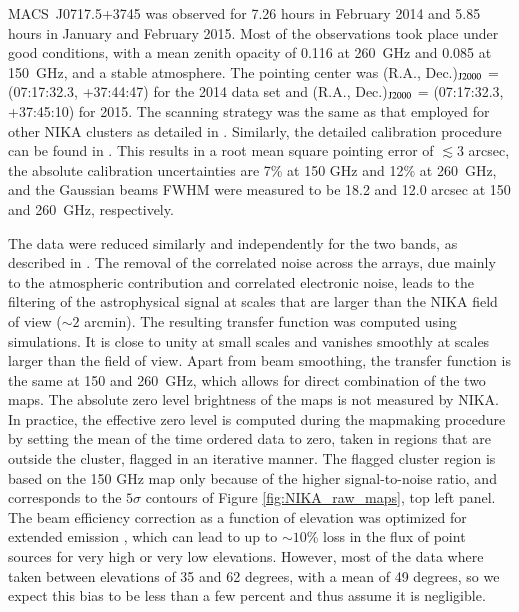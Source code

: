 \documentclass[twocolumn,traditabstract]{aa}
\begin{document}
\mbox{MACS~J0717.5+3745} was observed for 7.26 hours in February 2014 and 5.85 hours in January and February 2015. Most of the observations took place under good conditions, with a mean zenith opacity of 0.116 at 260~GHz and 0.085 at 150~GHz, and a stable atmosphere. The pointing center was (R.A., Dec.)$_{\rm J2000}$ = (07:17:32.3, +37:44:47) for the 2014 data set and (R.A., Dec.)$_{\rm J2000}$ = (07:17:32.3, +37:45:10) for 2015. The scanning strategy was the same as that employed for other NIKA clusters as detailed in \cite{Adam2015,Adam2016}. Similarly, the detailed calibration procedure can be found in \cite{Adam2014,Adam2015}. This results in a root mean square pointing error of $\lesssim 3$ arcsec, the absolute calibration uncertainties are 7\% at 150 GHz and 12\% at 260~GHz, and the Gaussian beams FWHM were measured to be 18.2 and 12.0 arcsec at 150 and 260~GHz, respectively.

The data were reduced similarly and independently for the two bands, as described in \cite{Adam2015}. The removal of the correlated noise across the arrays, due mainly to the atmospheric contribution and correlated electronic noise, leads to the filtering of the astrophysical signal at scales that are larger than the NIKA field of view ($\sim 2$ arcmin). The resulting transfer function was computed using simulations. It is close to unity at small scales and vanishes smoothly at scales larger than the field of view. Apart from beam smoothing, the transfer function is the same at 150 and 260~GHz, which allows for direct combination of the two maps. The absolute zero level brightness of the maps is not measured by NIKA. In practice, the effective zero level is computed during the mapmaking procedure by setting the mean of the time ordered data to zero, taken in regions that are outside the cluster, flagged in an iterative manner. The flagged cluster region is based on the 150 GHz map only because of the higher signal-to-noise ratio, and corresponds to the $5 \sigma$ contours of Figure \ref{fig:NIKA_raw_maps}, top left panel. The beam efficiency correction as a function of elevation was optimized for extended emission \citep{Greve1998}, which can lead to up to $\sim 10$\% loss in the flux of point sources for very high or very low elevations. However, most of the data where taken between elevations of 35 and 62 degrees, with a mean of 49 degrees, so we expect this bias to be less than a few percent and thus assume it is negligible.
\end{document}
